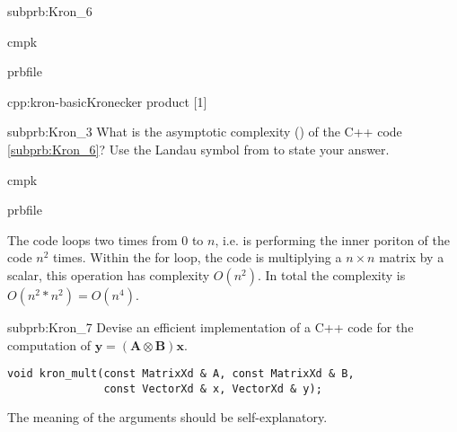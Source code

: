 \begin{samproblem}
\begin{subproblem}{subprb:Kron_6}
\begin{samwriteprbpart}{cmpk}
  \begin{writeverbatim}{prbfile}
    \begin{samsolution}
      \begin{samcode}[C++11-code]{cpp:kron-basic}{Kronecker product}
        [1]
      \end{samcode}
    \end{samsolution}
  \end{writeverbatim}
\end{samwriteprbpart}
\end{subproblem}

\begin{subproblem}{subprb:Kron_3}
What is the asymptotic complexity ()
of the C++ code \ref{subprb:Kron_6}? Use the Landau symbol
from  to state your answer.

\begin{samwriteprbpart}{cmpk}
  \begin{writeverbatim}{prbfile}
    \begin{samsolution}
      The code loops two times from $0$ to $n$, i.e. is performing the inner
      poriton of the code $n^2$ times.
      Within the for loop, the
      code is multiplying a $n \times n$ matrix by a scalar, this operation
      has complexity $O(n^2)$.
      In total the complexity is $O(n^2*n^2)=O(n^4)$.
      \end{samsolution}
    \end{writeverbatim}
  \end{samwriteprbpart}
\end{subproblem}

\begin{subproblem}{subprb:Kron_7}
  Devise an efficient implementation of a C++ code for the computation of
  $\mathbf{y} = (\mathbf{A} \otimes \mathbf{B}) \mathbf{x}$.
  \begin{lstlisting}[style=cppsimple]
void kron_mult(const MatrixXd & A, const MatrixXd & B,
               const VectorXd & x, VectorXd & y);
  \end{lstlisting}
  The meaning of the arguments should be self-explanatory.


\end{subproblem}
\end{samproblem}
